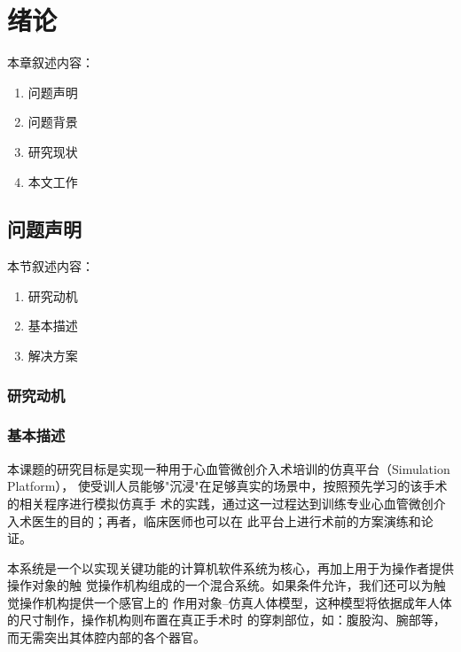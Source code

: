 \chapter{绪\;\;\;论}
\label{chap1}

本章叙述内容：
\begin{enumerate}
  \item 问题声明\cite{liu2003survey}
  \item 问题背景\cite{basdogan2007vr}
  \item 研究现状\cite{preim20083d}
  \item 本文工作\cite{lin1998collision}
\end{enumerate}

\section{问题声明}
\label{sec1-1}

本节叙述内容：
\begin{enumerate}
  \item 研究动机\cite{azuma1997survey}
  \item 基本描述\cite{meier2005deformable}
  \item 解决方案
\end{enumerate}

\subsection{研究动机}
\label{subsec1-1-1}

\subsection{基本描述}
\label{subsec1-1-2}

本课题的研究目标是实现一种用于心血管微创介入术培训的仿真平台（Simulation Platform），
使受训人员能够"沉浸"在足够真实的场景中，按照预先学习的该手术的相关程序进行模拟仿真手
术的实践，通过这一过程达到训练专业心血管微创介入术医生的目的；再者，临床医师也可以在
此平台上进行术前的方案演练和论证。

本系统是一个以实现关键功能的计算机软件系统为核心，再加上用于为操作者提供操作对象的触
觉操作机构组成的一个混合系统。如果条件允许，我们还可以为触觉操作机构提供一个感官上的
作用对象--仿真人体模型，这种模型将依据成年人体的尺寸制作，操作机构则布置在真正手术时
的穿刺部位，如：腹股沟、腕部等，而无需突出其体腔内部的各个器官。

